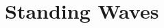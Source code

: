 \documentclass[12pt,aspectratio=169]{beamer}
\begin{document}
%

\section{Standing Waves}
\end{document}
